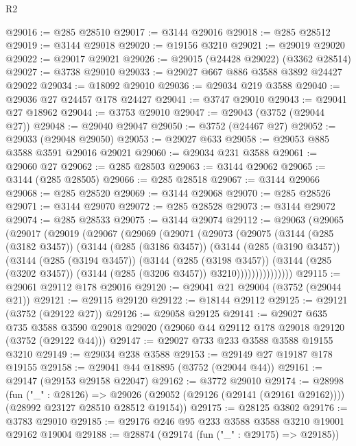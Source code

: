 \begin{lexlean}{R2}
\begin{coremodule}
@29016 := @285 @28510
@29017 := @3144 @29016
@29018 := @285 @28512
@29019 := @3144 @29018
@29020 := @19156 @3210
@29021 := @29019 @29020
@29022 := @29017 @29021
@29026 := @29015 (@24428 @29022) (@3362 @28514)
@29027 := @3738 @29010
@29033 := @29027 @667 @886 @3588 @3892 @24427 @29022
@29034 := @18092 @29010
@29036 := @29034 @219 @3588
@29040 := @29036 @27 @24457 @178 @24427
@29041 := @3747 @29010
@29043 := @29041 @27 @18962
@29044 := @3753 @29010
@29047 := @29043 (@3752 (@29044 @27))
@29048 := @29040 @29047
@29050 := @3752 (@24467 @27)
@29052 := @29033 (@29048 @29050)
@29053 := @29027 @633
@29058 := @29053 @885 @3588 @3591 @29016 @29021
@29060 := @29034 @231 @3588
@29061 := @29060 @27
@29062 := @285 @28503
@29063 := @3144 @29062
@29065 := @3144 (@285 @28505)
@29066 := @285 @28518
@29067 := @3144 @29066
@29068 := @285 @28520
@29069 := @3144 @29068
@29070 := @285 @28526
@29071 := @3144 @29070
@29072 := @285 @28528
@29073 := @3144 @29072
@29074 := @285 @28533
@29075 := @3144 @29074
@29112 := @29063
    (@29065
      (@29017
        (@29019
          (@29067
            (@29069
              (@29071
                (@29073
                  (@29075
                    (@3144
                      (@285 (@3182 @3457))
                      (@3144
                        (@285 (@3186 @3457))
                        (@3144
                          (@285 (@3190 @3457))
                          (@3144
                            (@285 (@3194 @3457))
                            (@3144
                              (@285 (@3198 @3457))
                              (@3144
                                (@285 (@3202 @3457))
                                (@3144 (@285 (@3206 @3457)) @3210)))))))))))))))
@29115 := @29061 @29112 @178 @29016
@29120 := @29041 @21 @29004 (@3752 (@29044 @21))
@29121 := @29115 @29120
@29122 := @18144 @29112
@29125 := @29121 (@3752 (@29122 @27))
@29126 := @29058 @29125
@29141 := @29027
    @635
    @735
    @3588
    @3590
    @29018
    @29020
    (@29060 @44 @29112 @178 @29018 @29120 (@3752 (@29122 @44)))
@29147 := @29027 @733 @233 @3588 @3588 @19155 @3210
@29149 := @29034 @238 @3588
@29153 := @29149 @27 @19187 @178 @19155
@29158 := @29041 @44 @18895 (@3752 (@29044 @44))
@29161 := @29147 (@29153 @29158 @22047)
@29162 := @3772 @29010
@29174 := @28998
    (fun ("_" : @28126) =>
    @29026 (@29052 (@29126 (@29141 (@29161 @29162)))) (@28992 @23127 @28510 @28512 @19154))
@29175 := @28125 @3802
@29176 := @3783 @29010
@29185 := @29176 @246 @95 @233 @3588 @3588 @3210 @19001 @29162 @19004
@29188 := @28874 (@29174 (fun ("_" : @29175) => @29185))

\end{coremodule}
\end{lexlean}
